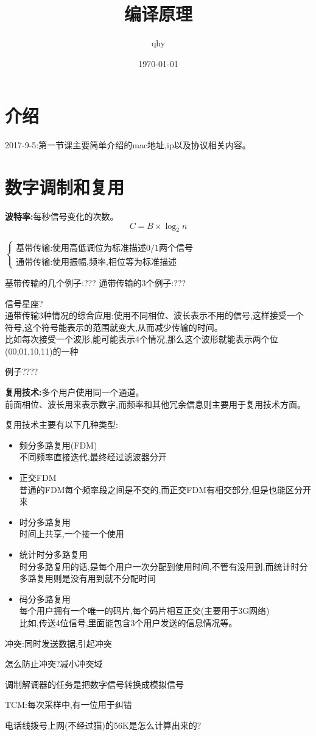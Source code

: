 \documentclass[UTF8,a4paper]{ctexart}
\author{ qhy }
\date{\today}
\title{编译原理}
\newcommand{\spaceline}{\vspace{\baselineskip}}
\begin{document}
  \maketitle
  \tableofcontents
  \newpage

  \section{介绍}
  2017-9-5:第一节课主要简单介绍的mac地址,ip以及协议相关内容。

  \section{数字调制和复用}
  \textbf{波特率:}每秒信号变化的次数。
  \[C = B \times \log_2 n\]

  \spaceline
  $\left \{ \begin{array}{l}
  \text{基带传输:使用高低调位为标准描述0/1两个信号}\\
  \text{通带传输:使用振幅,频率,相位等为标准描述}
  \end{array} \right .$

  基带传输的几个例子:???
  通带传输的3个例子:???

  信号星座?\\
  通带传输3种情况的综合应用:使用不同相位、波长表示不用的信号,这样接受一个符号,这个符号能表示的范围就变大,从而减少传输的时间。\\
  比如每次接受一个波形,能可能表示4个情况,那么这个波形就能表示两个位(00,01,10,11)的一种

  例子????

  \textbf{复用技术:}多个用户使用同一个通道。\\
  前面相位、波长用来表示数字,而频率和其他冗余信息则主要用于复用技术方面。

  复用技术主要有以下几种类型:
  \begin{itemize}
    \item 频分多路复用(FDM)\\
    不同频率直接迭代,最终经过滤波器分开
    \item 正交FDM\\
    普通的FDM每个频率段之间是不交的,而正交FDM有相交部分,但是也能区分开来
    \item 时分多路复用\\
    时间上共享,一个接一个使用
    \item 统计时分多路复用\\
    时分多路复用的话,是每个用户一次分配到使用时间,不管有没用到,而统计时分多路复用则是没有用到就不分配时间
    \item 码分多路复用\\
    每个用户拥有一个唯一的码片,每个码片相互正交(主要用于3G网络)\\
    比如,传送4位信号,里面能包含3个用户发送的信息情况等。
  \end{itemize}

  冲突:同时发送数据,引起冲突

  怎么防止冲突?减小冲突域

  调制解调器的任务是把数字信号转换成模拟信号

  TCM:每次采样中,有一位用于纠错

  电话线拨号上网(不经过猫)的56K是怎么计算出来的?
\end{document}

